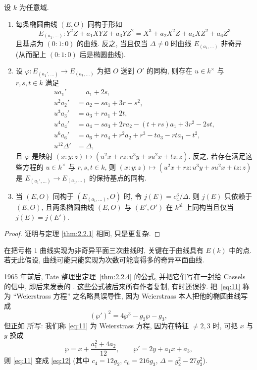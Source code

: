 \begin{theorem} \label{thm:2.2.4} 
设 $k$ 为任意域.
\begin{enumerate}[label=\textup{(\alph*)}]
\item 每条椭圆曲线 $(E,O)$ 同构于形如
\[
E_{(a_1,\dots)}\colon Y^2Z + a_1XYZ + a_3YZ^2 = X^3 + a_2X^2Z + a_4XZ^2 + a_6Z^3
\]
且基点为 $(0:1:0)$ 的曲线. 反之, 当且仅当 $\Delta\neq 0$ 时曲线 $E_{(a_1,\dots)}$ 非奇异 (从而配上 $(0:1:0)$ 后是椭圆曲线).
\item 设 $\varphi\colon E_{(a_1',\dots)}\to E_{(a_1,\dots)}$ 为把 $O$ 送到 $O'$ 的同构, 则存在 $u\in k^{\times}$ 与 $r,s,t\in k$ 满足
\[
\begin{aligned}
ua_1' &= a_1 + 2s,\\
u^2a_2' &= a_2 - sa_1 + 3r - s^2,\\
u^3a_3' &= a_3 + ra_1 + 2t,\\
u^4a_4' &= a_4 - sa_3 + 2ra_2 - (t+rs)a_1 + 3r^2 - 2st,\\
u^6a_6' &= a_6 + ra_4 + r^2a_2 + r^3 - ta_3 - rta_1 - t^2,\\
u^{12}\Delta' &= \Delta,
\end{aligned}
\]
且 $\varphi$ 是映射 $(x:y:z)\mapsto(u^2x + rz : u^3y + su^2x + tz : z)$. 反之, 若存在满足这些方程的 $u\in k^{\times}$ 与 $r,s,t\in k$, 则 $(x:y:z)\mapsto(u^2x + rz : u^3y + su^2x + tz : z)$ 是 $E_{(a_1',\dots)}\to E_{(a_1,\dots)}$ 的保持基点的同构.
\item 当 $(E,O)$ 同构于 $(E_{(a_1,\dots)}, O)$ 时, 令 $j(E) = c_4^3/\Delta$. 则 $j(E)$ 只依赖于 $(E,O)$, 且两条椭圆曲线 $(E,O)$ 与 $(E',O')$ 在 $k^{\mathrm{al}}$ 上同构当且仅当 $j(E) = j(E')$.
\end{enumerate}
\end{theorem}

\begin{proof}
证明与定理 \ref{thm:2.2.1} 相同, 只是更复杂.
\end{proof}

\begin{remark} \label{thm:2.2.5} 
在把亏格 $1$ 曲线实现为非奇异平面三次曲线时, 关键在于曲线具有 $E(k)$ 中的点. 若无此假设, 曲线可能只能实现为次数可能高得多的奇异平面曲线.
\end{remark}

\begin{remarkstar}
1965 年前后, Tate 整理出定理~\ref{thm:2.2.4} 的公式, 并把它们写在一封给 Cassels 的信中, 即后来发表的 \cite{tate1975}. 这些公式被后来所有作者复制, 有时还误抄. 把~\eqref{eq:11} 称为 ``Weierstrass 方程'' 之名略具误导性, 因为 Weierstrass 本人把他的椭圆曲线写成
\begin{equation} \label{eq:12}
(\wp')^2 = 4\wp^3 - g_2\wp - g_3,
\tag{12}
\end{equation}
但正如 \cite[\S2]{tate1974} 所写: 我们称 \eqref{eq:11} 为 Weierstrass 方程, 因为在特征 $\neq 2, 3$ 时, 可把 $x$ 与 $y$ 换成
\[
\wp = x + \frac{a_1^2 + 4a_2}{12}, \qquad
\wp' = 2y + a_1x + a_3,
\]
则 \eqref{eq:11} 变成 \eqref{eq:12} (其中 $c_4 = 12g_2$, $c_6 = 216g_3$, $\Delta = g_2^2 - 27g_3^2$).
\end{remarkstar}

